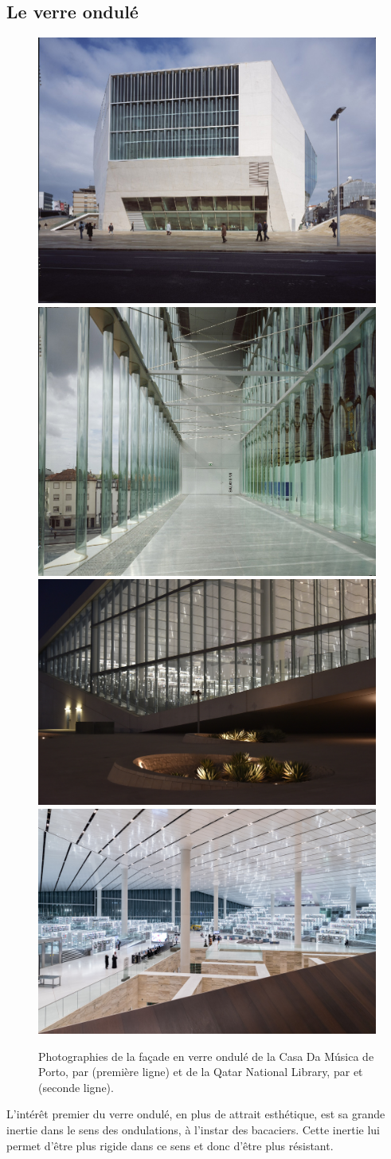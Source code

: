 \documentclass[11pt,titlepage]{article}
\begin{document}
\subsection{Le verre ondulé}
\begin{figure}[H]
    \centering
    \includegraphics[height=0.392\textwidth]{img/ondul/casa_musica4 (1).jpg}\hfill
    \includegraphics[height=0.392\textwidth]{img/ondul/casa_musica1 (1).jpg}
    \\[\smallskipamount]
    \includegraphics[height=0.331\textwidth]{img/ondul/02_Qatar_National_Library__Photo_by_Hans_Werlemann_4180.jpg}\hfill
    \includegraphics[height=0.331\textwidth]{img/ondul/07_Qatar_National_Library__Photo_by_Iwan_Baan_5345.jpg}
    \caption{Photographies de la façade en verre ondulé de la Casa Da Música de Porto, par \cite{CasaDaMusica} (première ligne) et de la Qatar National Library, par \cite{quatNatLib} et \cite{quatNatLib2} (seconde ligne).}
    \label{fig:CasaDaMusica}
\end{figure}
L'intérêt premier du verre ondulé, en plus de attrait esthétique, est sa grande inertie dans le sens des ondulations, à l'instar des bacaciers. Cette inertie lui permet d'être plus rigide dans ce sens et donc d'être plus résistant.
\end{document}
